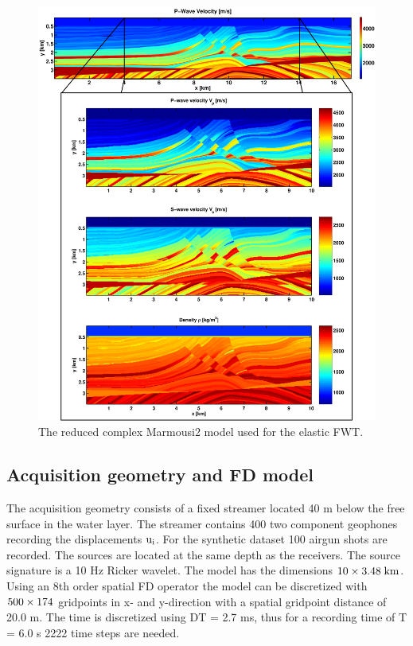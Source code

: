 \begin{figure}[!ht]
\centering
\includegraphics[width=14cm]{figures/marmousi/marmousi_complete_caption.pdf}
\caption{The reduced complex Marmousi2 model used for the elastic FWT.}
\label{marmousi_II_true_model}
\end{figure}
\clearpage\subsection{Acquisition geometry and FD model}
\label{marmousi_acq}
The acquisition geometry consists of a fixed streamer located 40 m below the free surface in the water layer. The streamer contains 400 two component geophones recording the displacements $\rm{u_i}$. For the synthetic dataset 100 airgun shots are recorded. The sources are located at the same depth as the receivers. The source signature is a 10 Hz Ricker wavelet. The model has the dimensions $\rm{10 \times 3.48\; km}$. Using an 8th order spatial FD operator the model can be discretized with $\rm{500 \times 174}$ gridpoints in x- and y-direction with a spatial gridpoint distance of 20.0 m. The time is discretized using DT = 2.7 ms, thus for a recording time of T = 6.0 s 2222 time steps are needed.
